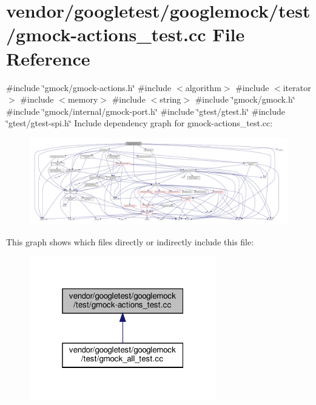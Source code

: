 \hypertarget{gmock-actions__test_8cc}{}\section{vendor/googletest/googlemock/test/gmock-\/actions\+\_\+test.cc File Reference}
\label{gmock-actions__test_8cc}
{\ttfamily \#include \char`\"{}gmock/gmock-\/actions.\+h\char`\"{}}\newline
{\ttfamily \#include $<$algorithm$>$}\newline
{\ttfamily \#include $<$iterator$>$}\newline
{\ttfamily \#include $<$memory$>$}\newline
{\ttfamily \#include $<$string$>$}\newline
{\ttfamily \#include \char`\"{}gmock/gmock.\+h\char`\"{}}\newline
{\ttfamily \#include \char`\"{}gmock/internal/gmock-\/port.\+h\char`\"{}}\newline
{\ttfamily \#include \char`\"{}gtest/gtest.\+h\char`\"{}}\newline
{\ttfamily \#include \char`\"{}gtest/gtest-\/spi.\+h\char`\"{}}\newline
Include dependency graph for gmock-\/actions\+\_\+test.cc\+:
\nopagebreak
\begin{figure}[H]
\begin{center}
\leavevmode
\includegraphics[width=350pt]{gmock-actions__test_8cc__incl}
\end{center}
\end{figure}
This graph shows which files directly or indirectly include this file\+:
\nopagebreak
\begin{figure}[H]
\begin{center}
\leavevmode
\includegraphics[width=229pt]{gmock-actions__test_8cc__dep__incl}
\end{center}
\end{figure}
